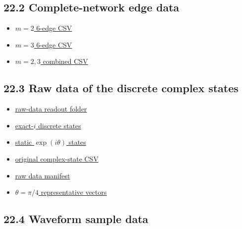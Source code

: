 \documentclass[
  a4paper,
]{article}
\providecommand{\tightlist}{%
  \setlength{\itemsep}{0pt}\setlength{\parskip}{0pt}}
\begin{document}
\subsection{22.2 Complete-network edge
data}\label{complete-network-edge-data}

\begin{itemize}
\tightlist
\item
  \href{edges_m2.csv}{\(m=2\) 6-edge CSV}
\item
  \href{edges_m3.csv}{\(m=3\) 6-edge CSV}
\item
  \href{all_edges_m2_m3.csv}{\(m=2,3\) combined CSV}
\end{itemize}

\subsection{22.3 Raw data of the discrete complex
states}\label{raw-data-of-the-discrete-complex-states}

\begin{itemize}
\tightlist
\item
  \href{reproducibility_raw_readout_20260915/}{raw-data readout folder}
\item
  \href{reproducibility_raw_readout_20260915/raw_data/complex_states_animation_exact_i.csv}{exact-\(i\)
  discrete states}
\item
  \href{reproducibility_raw_readout_20260915/raw_data/complex_states_static_exp.csv}{static
  \(\exp(i\theta)\) states}
\item
  \href{reproducibility_raw_readout_20260915/raw_data/complex_states.csv}{original
  complex-state CSV}
\item
  \href{reproducibility_raw_readout_20260915/raw_data/RAW_DATA_MANIFEST.csv}{raw
  data manifest}
\item
  \href{reproducibility_raw_readout_20260915/raw_data/representative_vectors_theta_pi4.csv}{\(\theta=\pi/4\)
  representative vectors}
\end{itemize}

\subsection{22.4 Waveform sample data}\label{waveform-sample-data}
\end{document}
